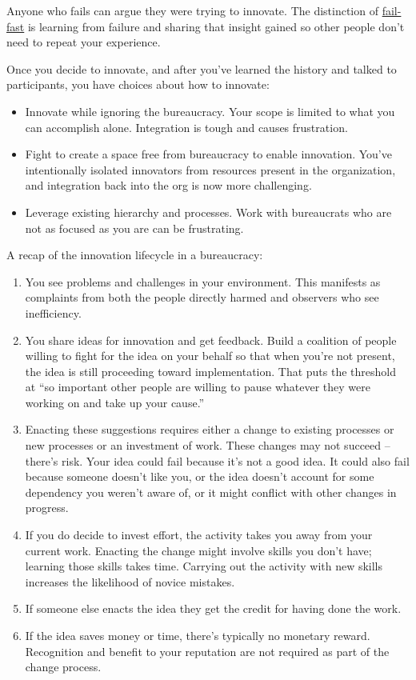 Anyone who fails can argue they were trying to innovate. The distinction of \href{https://en.wikipedia.org/wiki/Fail-fast#Business}{fail-fast}\iftoggle{WPinmargin}{\marginpar{[Wikipedia] Fail-fast}}{}
 is learning from failure and sharing that insight gained so other people don't need to repeat your experience. 


Once you decide to innovate, and after you've learned the history and talked to participants, you have choices about how to innovate:
\begin{itemize}
\item Innovate while ignoring the bureaucracy. Your scope is limited to what you can accomplish alone. Integration is tough and causes frustration.
\item Fight to create a space free from bureaucracy to enable innovation. You've intentionally isolated innovators from resources present in the organization, and integration back into the org is now more challenging. 
\item Leverage existing hierarchy and processes. Work with bureaucrats who are not as focused as you are can be frustrating.
\end{itemize}


A recap of the innovation lifecycle in a bureaucracy:
\begin{enumerate}
    \item You see problems and challenges in your environment. This manifests as complaints from both the people directly harmed and observers who see inefficiency.
    \item You share ideas for innovation and get feedback. Build a coalition of people willing to fight for the idea on your behalf
    so that when you're not present, the idea is still proceeding toward implementation.  That puts the threshold at ``so important other people are willing to pause whatever they were working on and take up your cause.''
    \item Enacting these suggestions requires either a change to existing processes or new processes or an investment of work. These changes may not succeed -- there's risk. Your idea could fail because it's not a good idea. It could also fail because someone doesn't like you, or the idea doesn't account for some dependency you weren't aware of, or it might conflict with other changes in progress.
    \item If you do decide to invest effort, the activity takes you away from your current work. Enacting the change might involve skills you don't have; learning those skills takes time. Carrying out the activity with new skills increases the likelihood of novice mistakes.
    \item If someone else enacts the idea they get the credit for having done the work.
    \item If the idea saves money or time, there's typically no monetary reward. Recognition and benefit to your reputation are not required as part of the change process. 
\end{enumerate}

